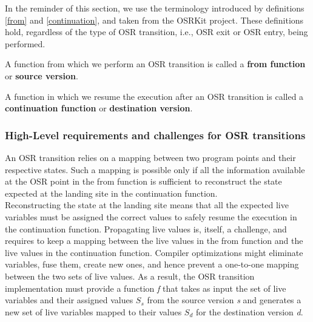 In the reminder of this section, we use the terminology introduced by definitions \ref{from} and \ref{continuation}, and taken from the OSRKit\cite{OSRKit} project.
These definitions hold, regardless of the type of OSR transition, i.e., OSR exit or OSR entry, being performed.

\begin{definition}\label{from}
A function from which we perform an OSR transition is called a \textbf{from function} or \textbf{source version}.
\end{definition}

\begin{definition}\label{continuation}
A function in which we resume the execution after an OSR transition is called a \textbf{continuation function} or \textbf{destination version}.
\end{definition}

\subsubsection{High-Level requirements and challenges for OSR transitions}\label{HLREQ}

An OSR transition relies on a mapping between two program points and their respective states.
Such a mapping is possible only if all the information available at the OSR point in the from function is sufficient to reconstruct the state expected at the landing site in the continuation function.\\

Reconstructing the state at the landing site means that all the expected live variables must be assigned the correct values to safely resume the execution in the continuation function.
Propagating live values is, itself, a challenge, and requires to keep a mapping between the live values in the from function and the live values in the continuation function.
Compiler optimizations might eliminate variables, fuse them, create new ones, and hence prevent a one-to-one mapping between the two sets of live values. 
As a result, the OSR transition implementation must provide a function \textit{f} that takes as input the set of live variables and their assigned values $S_s$ from the source version \textit{s} and generates a new set of live variables mapped to their values $S_d$ for the destination version \textit{d}.

